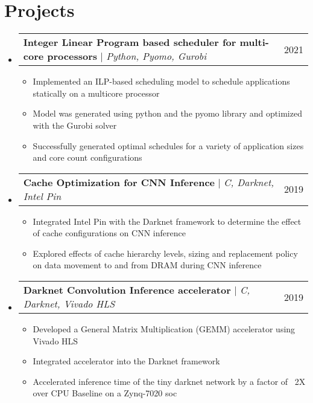 \documentclass[letterpaper,11pt]{article}
\makeatletter
\newcommand{\resumeItem}[1]{
  \item\small{
    {#1 \vspace{-2pt}}
  }
}
\newcommand{\resumeProjectHeading}[2]{
    \item
    \begin{tabular*}{0.97\textwidth}{l@{\extracolsep{\fill}}r}
      \small#1 & #2 \\
    \end{tabular*}\vspace{-7pt}
}
\newcommand{\resumeSubHeadingListStart}{\begin{itemize}[leftmargin=0.15in, label={}]}
\newcommand{\resumeSubHeadingListEnd}{\end{itemize}}
\newcommand{\resumeItemListStart}{\begin{itemize}}
\newcommand{\resumeItemListEnd}{\end{itemize}\vspace{-5pt}}
\makeatother
\begin{document}
\section{Projects} %
    \resumeSubHeadingListStart
      \resumeProjectHeading
          {\textbf{Integer Linear Program based scheduler for multi-core processors} $|$ \emph{Python, Pyomo, Gurobi}}{2021}
          \resumeItemListStart
            \resumeItem{Implemented an ILP-based scheduling model to schedule applications statically on a multicore processor }
            \resumeItem{Model was generated using python and the pyomo library and optimized with the Gurobi solver }
            \resumeItem{Successfully generated optimal schedules for a variety of application sizes and core count configurations}
          \resumeItemListEnd
        \resumeProjectHeading
          {\textbf{Cache Optimization for CNN Inference} $|$ \emph{C, Darknet, Intel Pin}}{2019}
          \resumeItemListStart
            \resumeItem{Integrated Intel Pin with the Darknet framework to determine the effect of cache configurations on CNN inference}
            \resumeItem{Explored effects of cache hierarchy levels, sizing and replacement policy on data movement to and from DRAM during CNN inference} %
          \resumeItemListEnd
        \resumeProjectHeading
          {\textbf{Darknet Convolution Inference accelerator} $|$ \emph{C, Darknet, Vivado HLS}}{2019}
          \resumeItemListStart
            \resumeItem{Developed a General Matrix Multiplication (GEMM) accelerator using Vivado HLS}
            \resumeItem{Integrated accelerator into the Darknet framework}
            \resumeItem{Accelerated inference time of the tiny darknet network by a factor of ~2X over CPU Baseline on a Zynq-7020 soc}
          \resumeItemListEnd
    \resumeSubHeadingListEnd

%
\end{document}
